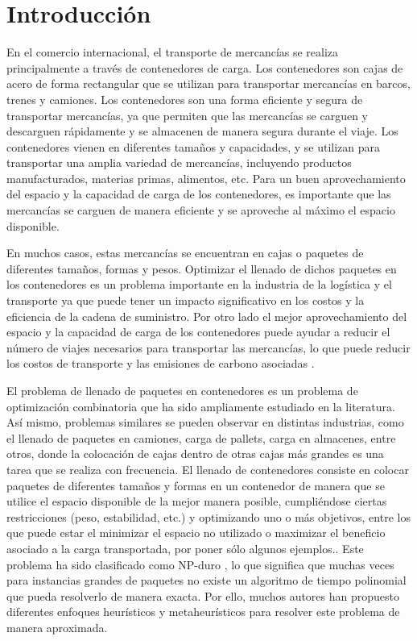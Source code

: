 \documentclass[openany]{article}
\begin{document}
\thispagestyle{empty}

\clearpage\thispagestyle{empty}\null\newpage %


\newpage




\section{Introducción} \label{sec: introducción}

En el comercio internacional, el transporte de mercancías se realiza principalmente a través de contenedores de carga. Los contenedores son cajas de acero de forma rectangular que se utilizan para transportar mercancías en barcos, trenes y camiones. Los contenedores son una forma eficiente y segura de transportar mercancías, ya que permiten que las mercancías se carguen y descarguen rápidamente y se almacenen de manera segura durante el viaje. Los contenedores vienen en diferentes tamaños y capacidades, y se utilizan para transportar una amplia variedad de mercancías, incluyendo productos manufacturados, materias primas, alimentos, etc. Para un buen aprovechamiento del espacio y la capacidad de carga de los contenedores, es importante que las mercancías se carguen de manera eficiente y se aproveche al máximo el espacio disponible.

En muchos casos, estas mercancías se encuentran en cajas o paquetes de diferentes tamaños, formas y pesos. Optimizar el llenado de dichos paquetes en los contenedores es un problema importante en la industria de la logística y el transporte ya que puede tener un impacto significativo en los costos y la eficiencia de la cadena de suministro. Por otro lado el mejor aprovechamiento del espacio y la capacidad de carga de los contenedores puede ayudar a reducir el número de viajes necesarios para transportar las mercancías, lo que puede reducir los costos de transporte y las emisiones de carbono asociadas \parencite{Parreo2008AMA}.

El problema de llenado de paquetes en contenedores es un problema de optimización combinatoria que ha sido ampliamente estudiado en la literatura. Así mismo, problemas similares se pueden observar en distintas industrias, como el llenado de paquetes en camiones, carga de pallets, carga en almacenes, entre otros, donde la colocación de cajas dentro de otras cajas más grandes es una tarea que se realiza con frecuencia. El llenado de contenedores consiste en colocar paquetes de diferentes tamaños y formas en un contenedor de manera que se utilice el espacio disponible de la mejor manera posible, cumpliéndose ciertas restricciones (peso, estabilidad, etc.) y optimizando uno o más objetivos, entre los que puede estar el minimizar el espacio no utilizado o maximizar el beneficio asociado a la carga transportada, por poner sólo algunos ejemplos.. Este problema ha sido clasificado como NP-duro \parencite{PISINGER2002382}, lo que significa que muchas veces para instancias grandes de paquetes no existe un algoritmo de tiempo polinomial que pueda resolverlo de manera exacta. Por ello, muchos autores han propuesto diferentes enfoques heurísticos y metaheurísticos para resolver este problema de manera aproximada.
\end{document}
